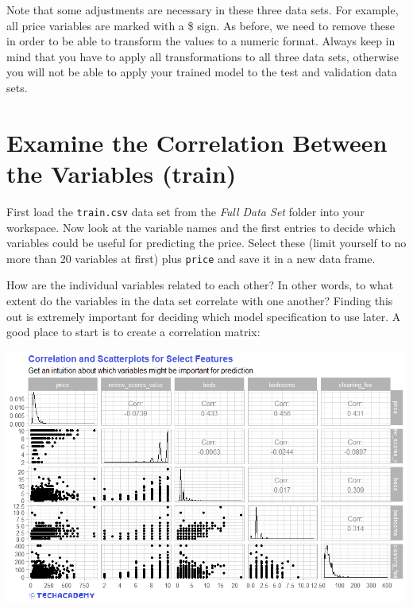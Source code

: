 \documentclass[
  11pt,
]{book}
\begin{document}
Note that some adjustments are necessary in these three data sets. For example, all price variables are marked with a \$ sign. As before, we need to remove these in order to be able to transform the values to a numeric format. Always keep in mind that you have to apply all transformations to all three data sets, otherwise you will not be able to apply your trained model to the test and validation data sets.

\hypertarget{examine-the-correlation-between-the-variables-train}{%
\section{Examine the Correlation Between the Variables (train)}\label{examine-the-correlation-between-the-variables-train}}

First load the \texttt{train.csv} data set from the \emph{Full Data Set} folder into your workspace. Now look at the variable names and the first entries to decide which variables could be useful for predicting the price. Select these (limit yourself to no more than 20 variables at first) plus \texttt{price} and save it in a new data frame.

How are the individual variables related to each other? In other words, to what extent do the variables in the data set correlate with one another? Finding this out is extremely important for deciding which model specification to use later. A good place to start is to create a correlation matrix:

\begin{center}\includegraphics[width=1\linewidth]{plot/5_1_ggpairs} \end{center}
\end{document}
